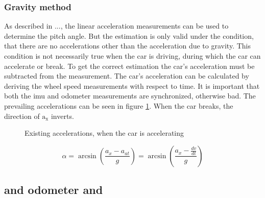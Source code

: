 \subsubsection{Gravity method}
\label{subsubsec:gravity_method}
As described in ..., the linear acceleration measurements can be used to determine the pitch angle.
But the estimation is only valid under the condition, that there are no accelerations other than the acceleration due to gravity.
This condition is not necessarily true when the car is driving, during which the car can accelerate or break.
To get the correct estimation the car's acceleration must be subtracted from the measurement.
The car's acceleration can be calculated by deriving the wheel speed measurements with respect to time.
It is important that both the \gls{imu} and odometer measurements are synchronized, otherwise bad.
The prevailing accelerations can be seen in figure \ref{fig:tikz_car_gravity}.
When the car breaks, the direction of $\mathrm{a}_\mathrm{x}$ inverts.
\begin{figure}[htpb]
    \centering
    
    \caption{Existing accelerations, when the car is accelerating}
    \label{fig:tikz_car_gravity}
\end{figure}
\begin{equation}
    \alpha = \arcsin\left(\frac{a_x-a_{at}}{g}\right)
    = \arcsin\left(\frac{a_x-\frac{dv}{dt}}{g}\right)
\end{equation}


\subsection{ and odometer and }
